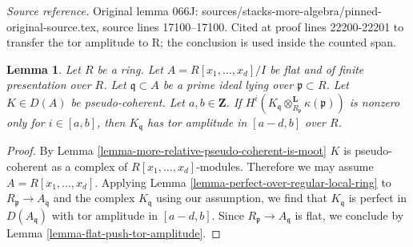 \documentclass[10pt,a4paper]{amsart}
\theoremstyle{plain}
\newtheorem{lemma}[subsection]{Lemma}
\theoremstyle{definition}
\theoremstyle{remark}
\numberwithin{equation}{subsection}
\begin{document}
\noindent\textit{Source reference.} Original lemma 066J: sources/stacks-more-algebra/pinned-original-source.tex, source lines 17100--17100. Cited at proof lines 22200-22201 to transfer the tor amplitude to R; the conclusion is used inside the counted span.\par\medskip
\begin{lemma}
\label{lemma-lift-from-fibre-relatively-perfect}
Let $R$ be a ring. Let $A = R[x_1, \ldots, x_d]/I$
be flat and of finite presentation over $R$.
Let $\mathfrak q \subset A$ be a prime ideal lying over
$\mathfrak p \subset R$. Let $K \in D(A)$ be pseudo-coherent.
Let $a, b \in \mathbf{Z}$. If
$H^i(K_\mathfrak q \otimes_{R_\mathfrak p}^\mathbf{L} \kappa(\mathfrak p))$
is nonzero only for $i \in [a, b]$, then
$K_\mathfrak q$ has tor amplitude in $[a - d, b]$ over $R$.
\end{lemma}

\begin{proof}
By Lemma \ref{lemma-more-relative-pseudo-coherent-is-moot}
$K$ is pseudo-coherent as a complex of $R[x_1, \ldots, x_d]$-modules.
Therefore we may assume $A = R[x_1, \ldots, x_d]$.
Applying Lemma \ref{lemma-perfect-over-regular-local-ring}
to $R_\mathfrak p \to A_\mathfrak q$ and the complex $K_\mathfrak q$
using our assumption, we find that $K_\mathfrak q$ is perfect
in $D(A_\mathfrak q)$ with tor amplitude in $[a - d, b]$.
Since $R_\mathfrak p \to A_\mathfrak q$ is flat, we conclude
by Lemma \ref{lemma-flat-push-tor-amplitude}.
\end{proof}
\end{document}
